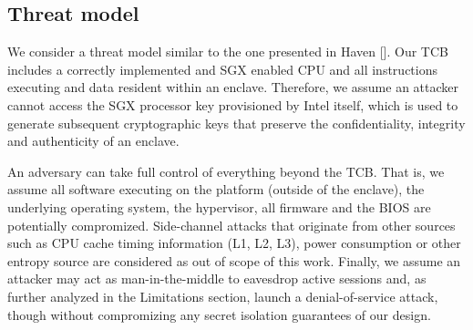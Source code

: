 \documentclass[../main.tex]{subfiles}
\begin{document}
\subsection{Threat model} %
We consider a threat model similar to the one presented in Haven []. Our TCB
includes a correctly implemented and SGX enabled CPU and all instructions
executing and data resident within an enclave. Therefore, we assume an attacker
cannot access the SGX processor key provisioned by Intel itself, which is used
to generate subsequent cryptographic keys that preserve the confidentiality,
integrity and authenticity of an enclave.

An adversary can take full control of everything beyond the TCB. That is, we
assume all software executing on the platform (outside of the enclave), the
underlying operating system, the hypervisor, all firmware and the BIOS are
potentially compromized. Side-channel attacks that originate from other sources
such as CPU cache timing information (L1, L2, L3), power consumption or other
entropy source are considered as out of scope of this work. Finally, we assume
an attacker may act as man-in-the-middle to eavesdrop active sessions and,
as further analyzed in the Limitations section, launch a denial-of-service
attack, though without compromizing any secret isolation guarantees of our
design.
\end{document}
